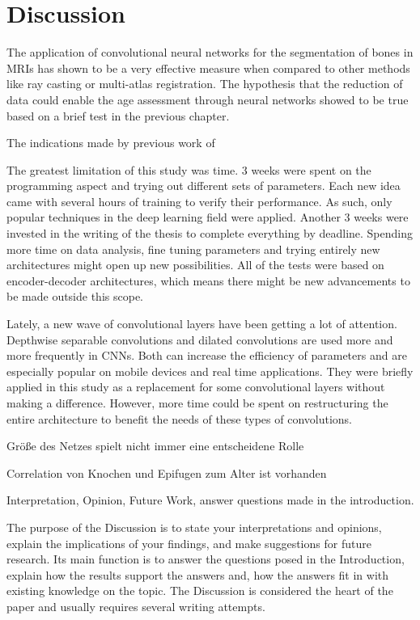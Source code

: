 \section{Discussion}

The application of convolutional neural networks for the segmentation of bones in MRIs has shown to be a very effective measure when compared to other methods like ray casting or multi-atlas registration. The hypothesis that the reduction of data could enable the age assessment through neural networks showed to be true based on a brief test in the previous chapter. 


The indications made by previous work of 

The greatest limitation of this study was time. 3 weeks were spent on the programming aspect and trying out different sets of parameters. Each new idea came with several hours of training to verify their performance. As such, only popular techniques in the deep learning field were applied. Another 3 weeks were invested in the writing of the thesis to complete everything by deadline. Spending more time on data analysis, fine tuning parameters and trying entirely new architectures might open up new possibilities. All of the tests were based on encoder-decoder architectures, which means there might be new advancements to be made outside this scope.

Lately, a new wave of convolutional layers have been getting a lot of attention. Depthwise separable convolutions and dilated convolutions are used more and more frequently in CNNs. Both can increase the efficiency of parameters and are especially popular on mobile devices and real time applications. They were briefly applied in this study as a replacement for some convolutional layers without making a difference. However, more time could be spent on restructuring the entire architecture to benefit the needs of these types of convolutions.





Größe des Netzes spielt nicht immer eine entscheidene Rolle

Correlation von Knochen und Epifugen zum Alter ist vorhanden


Interpretation, Opinion, Future Work, answer questions made in the introduction.

The purpose of the Discussion is to state your interpretations and opinions, explain the implications of your findings, and make suggestions for future research. Its main function is to answer the questions posed in the Introduction, explain how the results support the answers and, how the answers fit in with existing knowledge on the topic. The Discussion is considered the heart of the paper and usually requires several writing attempts. 


